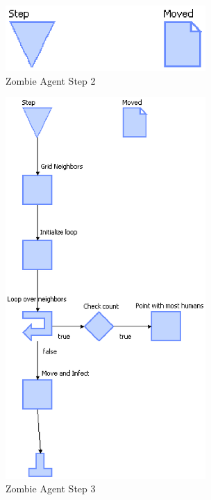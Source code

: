 \documentclass[11pt]{amsart}
\begin{document}
\begin{figure}[p]
\begin{center}
\vspace{.2in}
\centerline {
\includegraphics[width=3in]{figs/Zombie_2.eps}
}
\caption{Zombie Agent Step 2}
\label{fig:zombie2}
\end{center}
\end{figure}

\begin{figure}[p]
\begin{center}
\vspace{.2in}
\centerline {
\includegraphics[width=3in]{figs/Zombie_3.eps}
}
\caption{Zombie Agent Step 3}
\label{fig:zombie3}
\end{center}
\end{figure}
\end{document}
